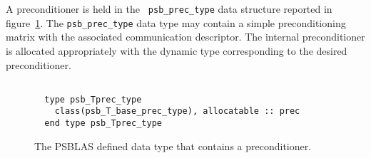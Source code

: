  A preconditioner is held in the \hypertarget{precdata}{{\tt
    psb\_prec\_type}} data structure reported in 
figure~\ref{fig:prectype}. The \verb|psb_prec_type| 
data type may contain a simple preconditioning matrix with the
associated communication descriptor.%
The internal preconditioner is allocated appropriately with the
dynamic type corresponding to the desired preconditioner. 
\begin{figure}[h!]
  \small
\begin{center}
    \begin{minipage}[tl]{0.9\textwidth}
\begin{verbatim}

  type psb_Tprec_type
    class(psb_T_base_prec_type), allocatable :: prec
  end type psb_Tprec_type

\end{verbatim}
    \end{minipage}
  \end{center}
  \caption{\label{fig:prectype}The PSBLAS defined data type that contains a preconditioner.}
\end{figure}

